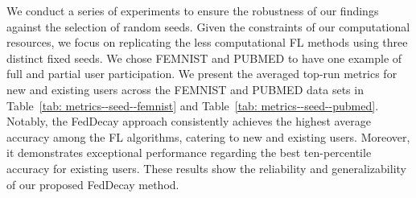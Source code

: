 We conduct a series of experiments to ensure the robustness of our findings against the selection of random seeds.
Given the constraints of our computational resources, we focus on replicating the less computational FL methods using three distinct fixed seeds.
We chose FEMNIST and PUBMED to have one example of full and partial user participation.
We present the averaged top-run metrics for new and existing users across the FEMNIST and PUBMED data sets in Table~\ref{tab: metrics--seed--femnist} and Table~\ref{tab: metrics--seed--pubmed}.
Notably, the FedDecay approach consistently achieves the highest average accuracy among the FL algorithms, catering to new and existing users.
Moreover, it demonstrates exceptional performance regarding the best ten-percentile accuracy for existing users.
These results show the reliability and generalizability of our proposed FedDecay method.

